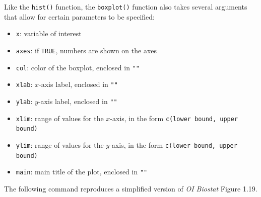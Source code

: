 \documentclass{report}\usepackage[]{graphicx}\usepackage[]{color}
\begin{document}
Like the \texttt{hist()} function, the \texttt{boxplot()} function also takes several arguments that allow for certain parameters to be specified:
\begin{itemize}
\item \texttt{x}: variable of interest
\item \texttt{axes}: if \texttt{TRUE}, numbers are shown on the axes
\item \texttt{col}: color of the boxplot, enclosed in \texttt{""}
\item \texttt{xlab}: $x$-axis label, enclosed in \texttt{""}
\item \texttt{ylab}: $y$-axis label, enclosed in \texttt{""}
\item \texttt{xlim}: range of values for the $x$-axis, in the form \texttt{c(lower bound, upper bound)}
\item \texttt{ylim}: range of values for the $y$-axis, in the form \texttt{c(lower bound, upper bound)}
\item \texttt{main}: main title of the plot, enclosed in \texttt{""} 
\end{itemize}

The following command reproduces a simplified version of \textit{OI Biostat} Figure 1.19. 
\end{document}
